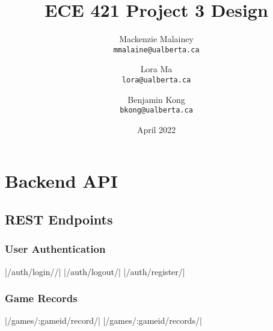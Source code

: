 \documentclass{article}
\title{ECE 421 Project 3 Design}
\author{
  Mackenzie Malainey\\
  \texttt{mmalaine@ualberta.ca}
  \and
  Lora Ma\\
  \texttt{lora@ualberta.ca}
  \and
  Benjamin Kong\\
  \texttt{bkong@ualberta.ca}
}
\date{April 2022}
\begin{document}
\begin{titlepage}
    \maketitle
    \tableofcontents
\end{titlepage}

\section{Backend API}

\subsection{REST Endpoints}

\subsubsection{User Authentication}

|/auth/login//|
|/auth/logout/|
|/auth/register/|

\subsubsection{Game Records}

|/games/:gameid/record/|
|/games/:gameid/records/|
\end{document}
